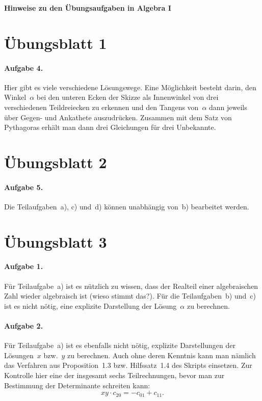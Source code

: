 \documentclass{../algblatt}
\begin{document}
\begin{center}\Large \textsf{\textbf{Hinweise zu den Übungsaufgaben in Algebra I}}\end{center}
\vspace{1em}


\section*{Übungsblatt 1}

\paragraph{Aufgabe 4.} Hier gibt es viele verschiedene Lösungswege. Eine
Möglichkeit besteht darin, den Winkel~$\alpha$ bei den unteren Ecken der Skizze
als Innenwinkel von drei verschiedenen Teildreiecken zu erkennen und den
Tangens von~$\alpha$ dann jeweils über Gegen- und Ankathete auszudrücken.
Zusammen mit dem Satz von Pythagoras erhält man dann drei Gleichungen für drei
Unbekannte.


\section*{Übungsblatt 2}

\paragraph{Aufgabe 5.} Die Teilaufgaben~a), c) und~d) können unabhängig von~b)
bearbeitet werden.


\section*{Übungsblatt 3}

\paragraph{Aufgabe 1.} Für Teilaufgabe~a) ist es nützlich zu wissen, dass der
Realteil einer algebraischen Zahl wieder algebraisch ist (wieso stimmt das?).
Für die Teilaufgaben~b) und~c) ist es nicht nötig, eine
explizite Darstellung der Lösung~$\alpha$ zu berechnen.

\paragraph{Aufgabe 2.} Für Teilaufgabe~a) ist es ebenfalls nicht nötig,
explizite Darstellungen der Lösungen~$x$ bzw.~$y$ zu berechnen. Auch ohne deren
Kenntnis kann man nämlich das Verfahren aus Proposition~1.3 bzw. Hilfssatz~1.4 des
Skripts einsetzen. Zur Kontrolle hier eine der insgesamt sechs Teilrechnungen,
bevor man zur Bestimmung der Determinante schreiten kann:
\[ xy \cdot c_{20} = -c_{01} + c_{11}. \]
\end{document}
